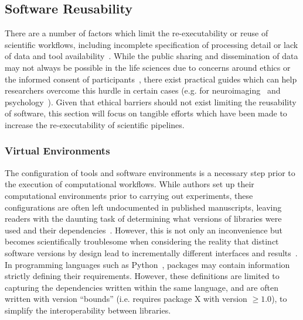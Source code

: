 \subsection{Software Reusability}
There are a number of factors which limit the re-executability or reuse of scientific workflows, including incomplete specification
of processing detail or lack of data and tool availability~\cite{ioannidis2009repeatability}. While the public sharing
and dissemination of data may not always be possible in the life sciences due to concerns around ethics or the informed
consent of participants~\cite{ross2018ethical,duke2013ethics}, there exist practical guides which can help researchers
overcome this hurdle in certain cases (e.g. for neuroimaging~\cite{brakewood2013ethics} and
psychology~\cite{meyer2018practical}). Given that ethical barriers should not exist limiting the reusability of
software, this section will focus on tangible efforts which have been made to increase the re-executability of
scientific pipelines.

\subsubsection{Virtual Environments}
The configuration of tools and software environments is a necessary step prior to the execution of computational
workflows. While authors set up their computational environments prior to carrying out experiments, these
configurations are often left undocumented in published manuscripts, leaving readers with the daunting task of
determining what versions of libraries were used and their dependencies~\cite{robles2010replicating}. However, this is
not only an inconvenience but becomes scientifically troublesome when considering the reality that distinct software
versions by design lead to incrementally different interfaces and results~\cite{raymond1997cathedral}. In programming
languages such as Python~\cite{oliphant2007python}, packages may contain information strictly defining their
requirements. However, these definitions are limited to capturing the dependencies written within the same language,
and are often written with version ``bounds'' (i.e. requires package X with version $\geq 1.0$), to simplify the
interoperability between libraries.


